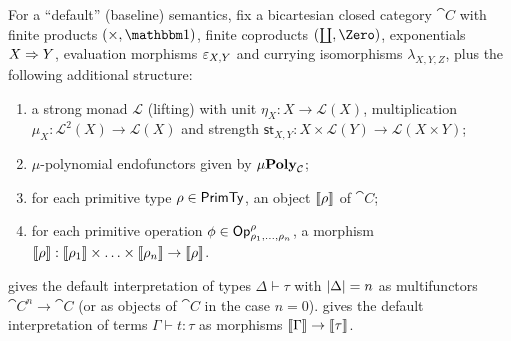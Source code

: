 For a ``default'' (baseline) semantics, fix a bicartesian closed category $\cat{C}$ with finite products
$(\times, \One)$, finite coproducts $(\coprod, \Zero)$, exponentials $X \Rightarrow Y$, evaluation
morphisms $\varepsilon_{X,Y}$ and currying isomorphisms $\lambda_{X,Y,Z}$, plus the following additional structure:
\begin{enumerate}
\item a strong monad $\mathcal{L}$ (lifting) with unit $\eta_X: X \to \mathcal{L}(X)$, multiplication $\mu_X:
\mathcal{L}^2(X) \to \mathcal{L}(X)$ and strength $\mathsf{st}_{X,Y}: X \times \mathcal{L}(Y) \to
\mathcal{L}(X \times Y)$;
\item $\mu$-polynomial endofunctors given by $\mu\mathbf{Poly}_{\mathcal{C}}$;
\item for each primitive type $\rho \in \mathsf{PrimTy}$, an object $\llbracket \rho \rrbracket$ of $\cat{C}$;
\item for each primitive operation $\phi \in \mathsf{Op}^\rho_{\rho_1,\ldots,\rho_n}$, a morphism $\llbracket \rho \rrbracket:
\llbracket \rho_1 \rrbracket \times \ldots \times \llbracket \rho_n \rrbracket \to \llbracket \rho \rrbracket$.
\end{enumerate}
 gives the default interpretation of types $\Delta \vdash \tau$ with
$|\Delta| = n$ as multifunctors $\cat{C}^n \to \cat{C}$ (or as objects of $\cat{C}$ in the case $n =
0$).  gives the default interpretation of terms $\Gamma \vdash t: \tau$ as
morphisms $\llbracket \Gamma \rrbracket \to \llbracket \tau \rrbracket$.
